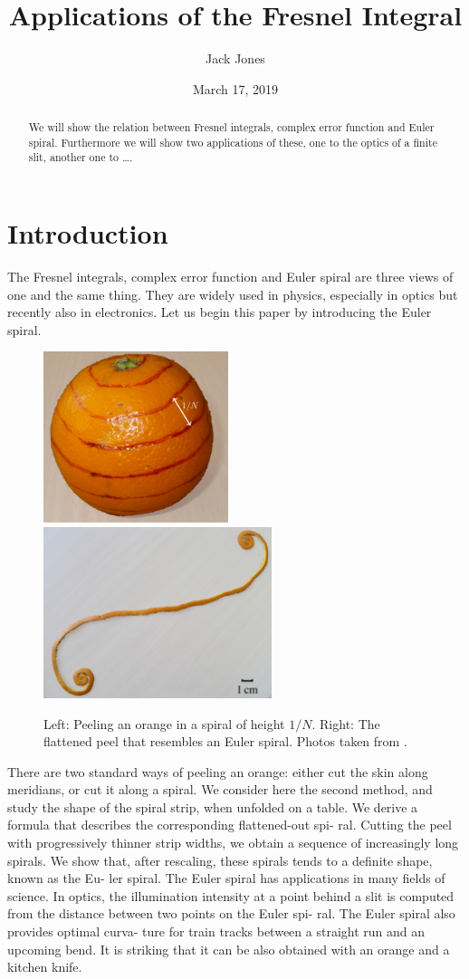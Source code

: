 \documentclass[12pt]{article}
\title{Applications of the Fresnel Integral}
\author{Jack Jones}
\date{March 17\th, 2019}
\begin{document}
\maketitle
\begin{abstract}
We will show the relation between Fresnel integrals, complex error function and Euler spiral.  Furthermore we will show two applications of these, one to the optics of a finite slit, another one to \dots.
\end{abstract}
\clearpage


\section{Introduction}
The Fresnel integrals, complex error function and Euler spiral are three views of one and the same thing.  They are widely used in physics, especially in optics but recently also in electronics.  Let us begin this paper by introducing the Euler spiral.

\begin{figure}[h!]
    \centering
	\includegraphics[height=5cm]{orange.jpg} \hfill
	\includegraphics[height=5cm]{orangePeel.jpg}
	\label{f:orangePeel}
	\caption{Left: Peeling an orange in a spiral of height $1/N$.
		Right: The flattened peel that resembles an Euler spiral.  Photos taken from \cite{BH12}.
	}
\end{figure}
There are two standard ways of peeling an orange: either cut the skin along meridians, or cut it along a spiral. We consider here the second method, and study the shape of the spiral strip, when unfolded on a table. We derive a formula that describes the corresponding flattened-out spi- ral. Cutting the peel with progressively thinner strip widths, we obtain a sequence of increasingly long spirals. We show that, after rescaling, these spirals tends to a definite shape, known as the Eu- ler spiral. The Euler spiral has applications in many fields of science. In optics, the illumination intensity at a point behind a slit is computed from the distance between two points on the Euler spi- ral. The Euler spiral also provides optimal curva- ture for train tracks between a straight run and an upcoming bend. It is striking that it can be also obtained with an orange and a kitchen knife.
\end{document}
